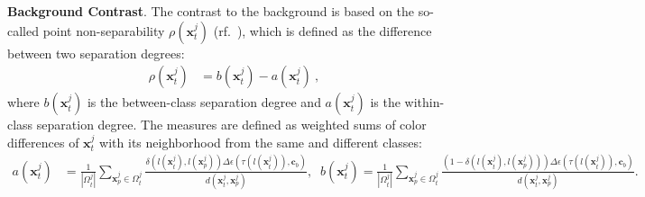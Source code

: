 %
%

\vspace{2mm}
\noindent\textbf{Background Contrast}.
The contrast to the background is based on the so-called point non-separability $\rho (\mathbf{x}^j_t)$ (rf.~\cite{Wang2018}), which is defined as the difference between two  separation degrees:
\begin{align}
\rho(\mathbf{x}^j_t)&= b(\mathbf{x}^j_t)-a(\mathbf{x}^j_t) \ ,
\end{align}
where $b(\mathbf{x}^j_t)$ is the between-class separation degree and $a(\mathbf{x}^j_t)$ is the within-class separation degree.
The measures are defined as weighted sums of  color differences of $\mathbf{x}^j_t$ with its neighborhood from the same and different classes:
\begin{align}
a(\mathbf{x}^j_t)&=\frac{1}{|\Omega^j_t|}\sum_{\mathbf{x}^j_p \in \Omega^j_t } \frac{\delta(l(\mathbf{x}^j_t), l(\mathbf{x}^j_p))
\Delta\epsilon(\tau(l(\mathbf{x}^j_t)),\mathbf{c}_b)
}{d(\mathbf{x}^j_t,\mathbf{x}^j_p)} , \;\;
b(\mathbf{x}^j_t)=\frac{1}{|\Omega^j_t|}\sum_{\mathbf{x}^j_p \in \Omega^j_t } \frac{(1-\delta(l(\mathbf{x}^j_t), l(\mathbf{x}^j_p)))\Delta\epsilon(\tau(l(\mathbf{x}^j_t)),\mathbf{c}_b)}{d(\mathbf{x}^j_t,\mathbf{x}^j_p)}  .\nonumber
\end{align}

